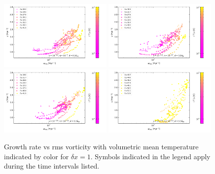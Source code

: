 \documentclass[preprint2]{aastex63}
\newcommand\dx{ {\delta x}}
\begin{document}
\begin{figure}
\centering
\includegraphics[trim=0.2cm 1.4cm 0.5cm 0.2cm,clip=true,width=0.49\textwidth]{csc_figs/gvw-1pcPm10e-40.png}
\includegraphics[trim=0.2cm 1.4cm 0.5cm 0.2cm,clip=true,width=0.49\textwidth]{csc_figs/gvw-1pcPm5e-37.png}
\includegraphics[trim=0.2cm 0.2cm 0.5cm 0.2cm,clip=true,width=0.49\textwidth]{csc_figs/gvw-1pcPm2e-33.png}
\includegraphics[trim=0.2cm 0.2cm 0.5cm 0.2cm,clip=true,width=0.49\textwidth]{csc_figs/gvw-1pcPm1e-30.png}
\caption{
Growth rate vs rms vorticity with volumetric mean temperature indicated by 
color for $\dx=1$.
Symbols indicated in the legend apply during the time intervals listed.
\label{fig:lsd-power}
}
\end{figure}
\end{document}

